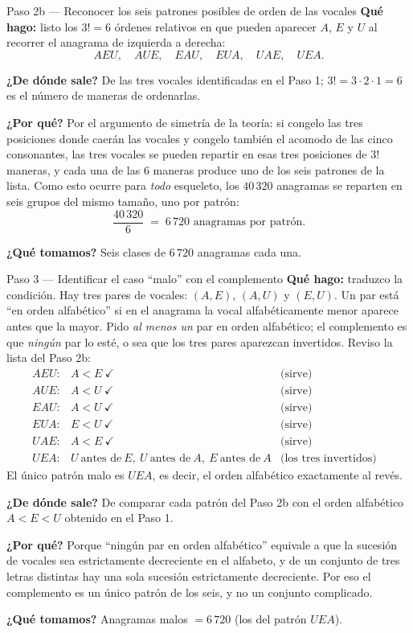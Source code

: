 \documentclass[11pt]{article}
\begin{document}
\begin{paso}{Paso 2b --- Reconocer los seis patrones posibles de orden de las vocales}
\textbf{Qué hago:} listo los $3!=6$ órdenes relativos en que pueden aparecer $A$, $E$ y $U$ al recorrer el
anagrama de izquierda a derecha:
\[
AEU,\quad AUE,\quad EAU,\quad EUA,\quad UAE,\quad UEA.
\]

\textbf{¿De dónde sale?} De las tres vocales identificadas en el Paso 1; $3!=3\cdot2\cdot1=6$ es el número de
maneras de ordenarlas.

\textbf{¿Por qué?} Por el argumento de simetría de la teoría: si congelo las tres posiciones donde caerán las
vocales y congelo también el acomodo de las cinco consonantes, las tres vocales se pueden repartir en esas
tres posiciones de $3!$ maneras, y cada una de las $6$ maneras produce uno de los seis patrones de la lista.
Como esto ocurre para \emph{todo} esqueleto, los $40\,320$ anagramas se reparten en seis grupos del mismo
tamaño, uno por patrón:
\[
\frac{40\,320}{6} \;=\; 6\,720 \text{ anagramas por patrón}.
\]

\textbf{¿Qué tomamos?} Seis clases de $6\,720$ anagramas cada una.
\end{paso}

\begin{paso}{Paso 3 --- Identificar el caso ``malo'' con el complemento}
\textbf{Qué hago:} traduzco la condición. Hay tres pares de vocales: $(A,E)$, $(A,U)$ y $(E,U)$. Un par está
``en orden alfabético'' si en el anagrama la vocal alfabéticamente menor aparece antes que la mayor. Pido
\emph{al menos un} par en orden alfabético; el complemento es que \emph{ningún} par lo esté, o sea que los
tres pares aparezcan invertidos. Reviso la lista del Paso 2b:
\[
\begin{array}{llll}
AEU: & A<E\ \checkmark & \text{(sirve)} & \\
AUE: & A<U\ \checkmark & \text{(sirve)} & \\
EAU: & A<U\ \checkmark & \text{(sirve)} & \\
EUA: & E<U\ \checkmark & \text{(sirve)} & \\
UAE: & A<E\ \checkmark & \text{(sirve)} & \\
UEA: & U\ \text{antes de}\ E,\ U\ \text{antes de}\ A,\ E\ \text{antes de}\ A & \text{(los tres invertidos)}
\end{array}
\]
El único patrón malo es $UEA$, es decir, el orden alfabético exactamente al revés.

\textbf{¿De dónde sale?} De comparar cada patrón del Paso 2b con el orden alfabético $A<E<U$ obtenido en el
Paso 1.

\textbf{¿Por qué?} Porque ``ningún par en orden alfabético'' equivale a que la sucesión de vocales sea
estrictamente decreciente en el alfabeto, y de un conjunto de tres letras distintas hay una sola sucesión
estrictamente decreciente. Por eso el complemento es un único patrón de los seis, y no un conjunto
complicado.

\textbf{¿Qué tomamos?} Anagramas malos $=6\,720$ (los del patrón $UEA$).
\end{paso}
\end{document}
